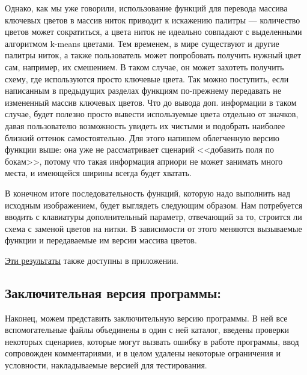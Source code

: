 \documentclass[12pt]{article}
\begin{document}
{	
	
	Однако, как мы уже говорили, использование функций для перевода массива ключевых цветов в массив ниток приводит к искажению палитры --- количество цветов может сократиться, а цвета ниток не идеально совпадают с выделенными алгоритмом k-means цветами. Тем временем, в мире существуют и другие палитры ниток, а также пользователь может попробовать получить нужный цвет сам, например, их смешением. В таком случае, он может захотеть получить схему, где используются просто ключевые цвета. Так можно поступить, если написанным в предыдущих разделах функциям по-прежнему передавать не измененный массив ключевых цветов. Что до вывода доп. информации в таком случае, будет полезно просто вывести используемые цвета отдельно от значков, давая пользователю возможность увидеть их чистыми и подобрать наиболее близкий оттенок самостоятельно. Для этого напишем облегченную версию функции выше: она уже не рассматривает сценарий <<добавить поля по бокам>>, потому что такая информация априори не может занимать много места, и имеющейся ширины всегда будет хватать.
	
		
	
	В конечном итоге последовательность функций, которую надо выполнить над исходным изображением, будет выглядеть следующим образом. Нам потребуется вводить с клавиатуры дополнительный параметр, отвечающий за то, строится ли схема с заменой цветов на нитки. В зависимости от этого меняются вызываемые функции и передаваемые им версии массива цветов.
	
		
	
	\hyperref[with_info_cats]{Эти результаты} также доступны в приложении.
	
	\subsection{Заключительная версия программы:}
	
	Наконец, можем представить заключительную версию программы. В ней все вспомогательные файлы объединены в один с ней каталог, введены проверки некоторых сценариев, которые могут вызвать ошибку в работе программы, ввод сопровожден комментариями, и в целом удалены некоторые ограничения и условности, накладываемые версией для тестирования.
	
}
\end{document}
